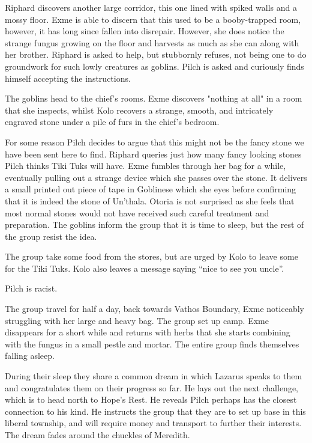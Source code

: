 \documentclass[letterpaper,10pt,twoside,twocolumn,openany]{book}
\begin{document}
Riphard discovers another large corridor, this one lined with spiked walls and a mossy floor. Exme is able to discern that this used to be a booby-trapped room, however, it has long since fallen into disrepair. However, she does notice the strange fungus growing on the floor and harvests as much as she can along with her brother. Riphard is asked to help, but stubbornly refuses, not being one to do groundwork for such lowly creatures as goblins. Pilch is asked and curiously finds himself accepting the instructions.

The goblins head to the chief’s rooms. Exme discovers "nothing at all" in a room that she inspects, whilst Kolo recovers a strange, smooth, and intricately engraved stone under a pile of furs in the chief’s bedroom.

For some reason Pilch decides to argue that this might not be the fancy stone we have been sent here to find. Riphard queries just how many fancy looking stones Pilch thinks Tiki Tuks will have. Exme fumbles through her bag for a while, eventually pulling out a strange device which she passes over the stone. It delivers a small printed out piece of tape in Goblinese which she eyes before confirming that it is indeed the stone of Un’thala. Otoria is not surprised as she feels that most normal stones would not have received such careful treatment and preparation. The goblins inform the group that it is time to sleep, but the rest of the group resist the idea.

The group take some food from the stores, but are urged by Kolo to leave some for the Tiki Tuks. Kolo also leaves a message saying “nice to see you uncle”.

Pilch is racist.

The group travel for half a day, back towards Vathos Boundary, Exme noticeably struggling with her large and heavy bag. The group set up camp. Exme disappears for a short while and returns with herbs that she starts combining with the fungus in a small pestle and mortar. The entire group finds themselves falling asleep.

During their sleep they share a common dream in which Lazarus speaks to them and congratulates them on their progress so far. He lays out the next challenge, which is to head north to Hope’s Rest. He reveals Pilch perhaps has the closest connection to his kind. He instructs the group that they are to set up base in this liberal township, and will require money and transport to further their interests. The dream fades around the chuckles of Meredith.
\end{document}
